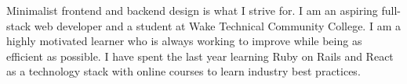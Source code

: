 	Minimalist frontend and backend design is what I strive for. I am an aspiring full-stack web developer and a student at Wake Technical Community College. I am a highly motivated learner who is always working to improve while being as efficient as possible. I have spent the last year learning Ruby on Rails and React as a technology stack with online courses to learn industry best practices.